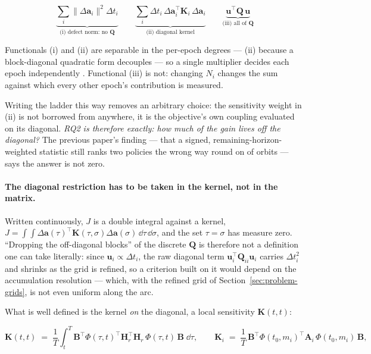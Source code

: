 \begin{equation}
  \underbrace{\textstyle\sum_i \lVert\Delta\mathbf a_i\rVert^2\Delta t_i}
             _{\text{(i) defect norm: no }\mathbf Q}
  \qquad
  \underbrace{\textstyle\sum_i \Delta t_i\,
     \Delta\mathbf a_i^{\top}\mathbf K_i\,\Delta\mathbf a_i}
             _{\text{(ii) diagonal kernel}}
  \qquad
  \underbrace{\mathbf u^{\top}\mathbf Q\,\mathbf u}
             _{\text{(iii) all of }\mathbf Q}
  \label{eq:three-functionals}
\end{equation}

Functionals (i) and (ii) are separable in the per-epoch degrees --- (ii)
because a block-diagonal quadratic form decouples --- so a single multiplier
decides each epoch independently \citep{everett1963generalized}. Functional
(iii) is not: changing $N_i$ changes the sum against which every other epoch's
contribution is measured.

Writing the ladder this way removes an arbitrary choice: the sensitivity weight
in (ii) is not borrowed from anywhere, it is the objective's own coupling
evaluated on its diagonal. \emph{RQ2 is therefore exactly: how much of the gain
lives off the diagonal?} The previous paper's finding --- that a signed,
remaining-horizon-weighted statistic still ranks two policies the wrong way
round on  of  orbits --- says the answer is not zero.

\paragraph{The diagonal restriction has to be taken in the kernel, not in the
matrix.} Written continuously, $J$ is a double integral against a kernel,
$J=\int\!\!\int\Delta\mathbf a(\tau)^{\top}\mathbf K(\tau,\sigma)
\Delta\mathbf a(\sigma)\,\dd\tau\,\dd\sigma$, and the set $\tau=\sigma$ has
measure zero. ``Dropping the off-diagonal blocks'' of the discrete
$\mathbf Q$ is therefore not a definition one can take literally: since
$\mathbf u_i\propto\Delta t_i$, the raw diagonal term
$\mathbf u_i^{\top}\mathbf Q_{ii}\mathbf u_i$ carries $\Delta t_i^2$ and shrinks
as the grid is refined, so a criterion built on it would depend on the
accumulation resolution --- which, with the refined grid of
Section~\ref{sec:problem-grids}, is not even uniform along the arc.

What is well defined is the kernel \emph{on} the diagonal, a local sensitivity
$\mathbf K(t,t)$:

\begin{equation}
  \mathbf K(t,t) \;=\; \frac{1}{T}\int_t^T
  \mathbf B^{\top}\Phi(\tau,t)^{\top}\mathbf H_r^{\top}\mathbf H_r\,
  \Phi(\tau,t)\,\mathbf B\;\dd\tau ,
  \qquad
  \mathbf K_i \;=\; \frac{1}{T}\,\mathbf B^{\top}\Phi(t_0,m_i)^{\top}
  \mathbf A_i\,\Phi(t_0,m_i)\,\mathbf B ,
  \label{eq:local-sensitivity}
\end{equation}

